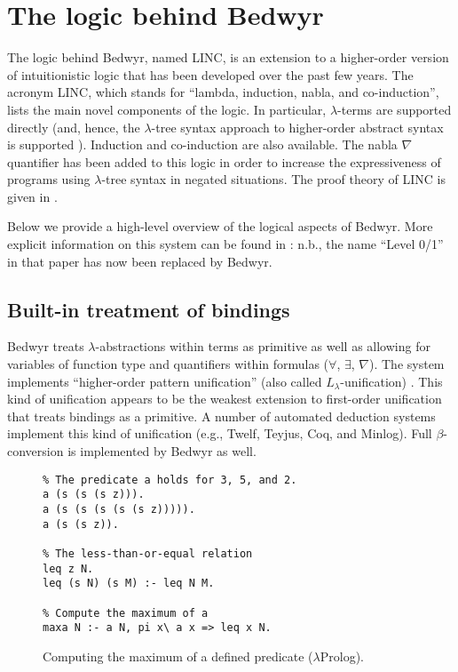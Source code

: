 \documentclass{article}
\newcommand{\lp}{$\lambda$Prolog}
\newcommand{\Ll}{$L_\lambda$}
\begin{document}
\section{The logic behind Bedwyr}
\label{logic}

The logic behind Bedwyr, named LINC, is an extension to a higher-order
version of intuitionistic logic that has been developed over the past
few years.  The acronym LINC, which stands for ``lambda, induction,
nabla, and co-induction'', lists the main novel components of the
logic.  In particular, $\lambda$-terms are supported directly (and,
hence, the $\lambda$-tree syntax approach to higher-order abstract
syntax is supported \cite{miller00cl}).  Induction and co-induction
are also available.  The nabla $\nabla$ quantifier has been added to
this logic in order to increase the expressiveness of programs using
$\lambda$-tree syntax in negated situations.  The proof theory of LINC
is given in \cite{miller05tocl,tiu04phd}.

Below we provide a high-level overview of the logical aspects of Bedwyr.
More explicit information on this system can be found in
\cite{tiu05eshol}: n.b., the name ``Level 0/1'' in that paper has now
been replaced by Bedwyr.

\subsection{Built-in treatment of bindings}

Bedwyr treats $\lambda$-abstractions within terms as primitive as well
as allowing for variables of function type and quantifiers within
formulas ($\forall$, $\exists$, $\nabla$).  The system
implements ``higher-order pattern unification'' (also called
\Ll-unification) \cite{miller91jlc}.   This kind of unification
appears to be the weakest extension to first-order unification that
treats bindings as a primitive.  A number of automated deduction systems
implement this kind of unification (e.g., Twelf, Teyjus, Coq, and
Minlog).  Full $\beta$-conversion is implemented by Bedwyr as well.

\begin{figure}
\begin{verbatim}
% The predicate a holds for 3, 5, and 2.
a (s (s (s z))).
a (s (s (s (s (s z))))).
a (s (s z)).

% The less-than-or-equal relation
leq z N.
leq (s N) (s M) :- leq N M.

% Compute the maximum of a
maxa N :- a N, pi x\ a x => leq x N.
\end{verbatim}
\caption{Computing the maximum of a defined predicate (\lp).}
\label{maxa-lp}
\end{figure}
\end{document}

